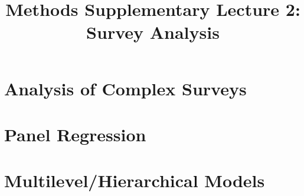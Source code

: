 
\usepackage{tikz}
\usetikzlibrary{shapes,arrows}

\title{Methods Supplementary Lecture 2:\\Survey Analysis}

\date[]{}



\frame{\titlepage}

\frame{\tableofcontents}

\section{Analysis of Complex Surveys}
\frame{\tableofcontents[currentsection]}

\frame{\frametitle{}}


\section{Panel Regression}
\frame{\tableofcontents[currentsection]}

\frame{\frametitle{}}


\section{Multilevel/Hierarchical Models}
\frame{\tableofcontents[currentsection]}

\frame{\frametitle{}}



\appendix
\frame{}



